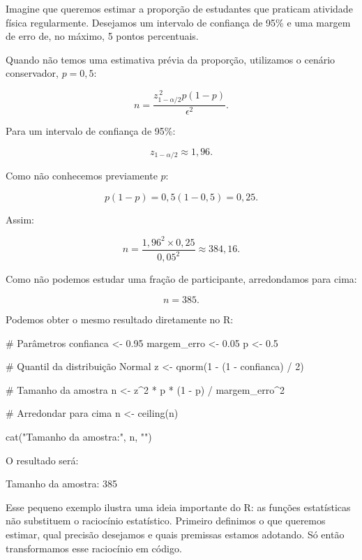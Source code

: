 Imagine que queremos estimar a proporção de estudantes que praticam atividade física regularmente. Desejamos um intervalo de confiança de 95\% e uma margem de erro de, no máximo, 5 pontos percentuais.

Quando não temos uma estimativa prévia da proporção, utilizamos o cenário conservador, $p=0{,}5$:

\begin{equation}
    n =
    \frac{
        z_{1-\alpha/2}^{\,2}p(1-p)
    }{
        \epsilon^2
    }.
\end{equation}

Para um intervalo de confiança de 95\%:

\[
    z_{1-\alpha/2} \approx 1{,}96.
\]

Como não conhecemos previamente $p$:

\[
    p(1-p)
    =
    0{,}5(1-0{,}5)
    =
    0{,}25.
\]

Assim:

\[
    n =
    \frac{
        1{,}96^2 \times 0{,}25
    }{
        0{,}05^2
    }
    \approx
    384{,}16.
\]

Como não podemos estudar uma fração de participante, arredondamos para cima:

\[
    \boxed{n=385}.
\]

Podemos obter o mesmo resultado diretamente no R:

\begin{code}
# Parâmetros
confianca <- 0.95
margem_erro <- 0.05
p <- 0.5

# Quantil da distribuição Normal
z <- qnorm(1 - (1 - confianca) / 2)

# Tamanho da amostra
n <- z^2 * p * (1 - p) / margem_erro^2

# Arredondar para cima
n <- ceiling(n)

cat("Tamanho da amostra:", n, "\n")
\end{code}

O resultado será:

\begin{code}[Resultado]
Tamanho da amostra: 385
\end{code}

Esse pequeno exemplo ilustra uma ideia importante do R: as funções estatísticas não substituem o raciocínio estatístico. Primeiro definimos o que queremos estimar, qual precisão desejamos e quais premissas estamos adotando. Só então transformamos esse raciocínio em código.

